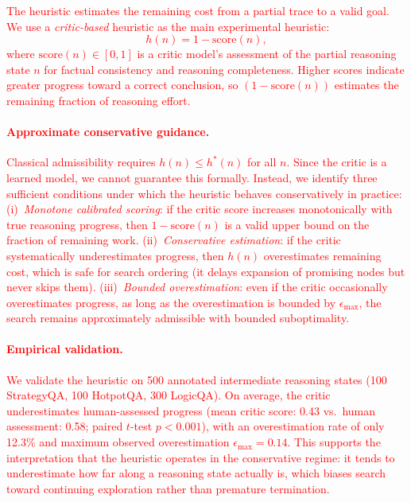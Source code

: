 \documentclass[11pt]{article}
\begin{document}
\textcolor{red}{The heuristic estimates the remaining cost from a partial trace to a valid goal. We use a \emph{critic-based} heuristic as the main experimental heuristic:
\begin{equation}
h(n) = 1 - \text{score}(n),
\label{eq:heuristic}
\end{equation}
where $\text{score}(n) \in [0,1]$ is a critic model's assessment of the partial reasoning state $n$ for factual consistency and reasoning completeness. Higher scores indicate greater progress toward a correct conclusion, so $(1 - \text{score}(n))$ estimates the remaining fraction of reasoning effort.}

\textcolor{red}{\paragraph{Approximate conservative guidance.}
Classical admissibility requires $h(n) \leq h^*(n)$ for all $n$. Since the critic is a learned model, we cannot guarantee this formally. Instead, we identify three sufficient conditions under which the heuristic behaves conservatively in practice: (i)~\emph{Monotone calibrated scoring}: if the critic score increases monotonically with true reasoning progress, then $1-\text{score}(n)$ is a valid upper bound on the fraction of remaining work. (ii)~\emph{Conservative estimation}: if the critic systematically underestimates progress, then $h(n)$ overestimates remaining cost, which is safe for search ordering (it delays expansion of promising nodes but never skips them). (iii)~\emph{Bounded overestimation}: even if the critic occasionally overestimates progress, as long as the overestimation is bounded by $\epsilon_{\max}$, the search remains approximately admissible with bounded suboptimality.}

\textcolor{red}{\paragraph{Empirical validation.}
We validate the heuristic on 500 annotated intermediate reasoning states (100 StrategyQA, 100 HotpotQA, 300 LogicQA). On average, the critic underestimates human-assessed progress (mean critic score: 0.43 vs.\ human assessment: 0.58; paired $t$-test $p < 0.001$), with an overestimation rate of only 12.3\% and maximum observed overestimation $\epsilon_{\max} = 0.14$. This supports the interpretation that the heuristic operates in the conservative regime: it tends to underestimate how far along a reasoning state actually is, which biases search toward continuing exploration rather than premature termination.}
\end{document}
